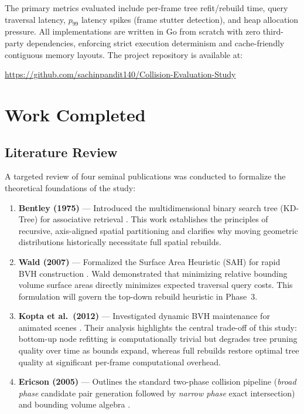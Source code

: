 \documentclass[12pt]{article}
\begin{document}
The primary metrics evaluated include per-frame tree refit/rebuild time, query traversal latency, $p_{99}$ latency spikes (frame stutter detection), and heap allocation pressure. All implementations are written in Go from scratch with zero third-party dependencies, enforcing strict execution determinism and cache-friendly contiguous memory layouts. The project repository is available at:
\begin{center}
    \url{https://github.com/sachinpandit140/Collision-Evaluation-Study}
\end{center}

\section{Work Completed}

\subsection{Literature Review}

A targeted review of four seminal publications was conducted to formalize the theoretical foundations of the study:

\begin{enumerate}
    \item \textbf{Bentley (1975)} --- Introduced the multidimensional binary search tree (KD-Tree) for associative retrieval \cite{bentley1975}. This work establishes the principles of recursive, axis-aligned spatial partitioning and clarifies why moving geometric distributions historically necessitate full spatial rebuilds.
    
    \item \textbf{Wald (2007)} --- Formalized the Surface Area Heuristic (SAH) for rapid BVH construction \cite{wald2007}. Wald demonstrated that minimizing relative bounding volume surface areas directly minimizes expected traversal query costs. This formulation will govern the top-down rebuild heuristic in Phase~3.
    
    \item \textbf{Kopta et al.\ (2012)} --- Investigated dynamic BVH maintenance for animated scenes \cite{kopta2012}. Their analysis highlights the central trade-off of this study: bottom-up node refitting is computationally trivial but degrades tree pruning quality over time as bounds expand, whereas full rebuilds restore optimal tree quality at significant per-frame computational overhead.
    
    \item \textbf{Ericson (2005)} --- Outlines the standard two-phase collision pipeline (\textit{broad phase} candidate pair generation followed by \textit{narrow phase} exact intersection) and bounding volume algebra \cite{ericson2005}.
\end{enumerate}
\end{document}
